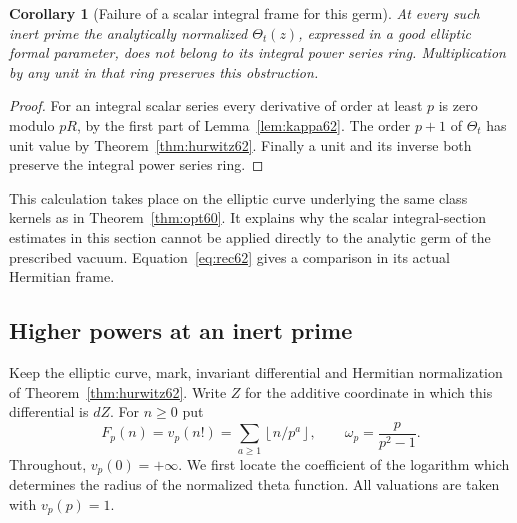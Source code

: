 \documentclass[a4paper,11pt]{article}
\newtheorem{corollary}[proposition]{Corollary}
\theoremstyle{definition}
\theoremstyle{remark}
\numberwithin{equation}{section}
\begin{document}
\begin{corollary}[Failure of a scalar integral frame for this germ]\label{cor:obstacle62}
At every such inert prime the analytically normalized
\(\Theta_t(z)\), expressed in a good elliptic formal parameter,
does not belong to its integral power series ring. Multiplication
by any unit in that ring preserves this obstruction.
\end{corollary}
\begin{proof}
For an integral scalar series every derivative of order at least
\(p\) is zero modulo \(pR\), by the first part of
Lemma~\ref{lem:kappa62}. The order \(p+1\) of \(\Theta_t\)
has unit value by Theorem~\ref{thm:hurwitz62}. Finally a unit
and its inverse both preserve the integral power series ring.
\end{proof}

This calculation takes place on the elliptic curve underlying the
same class kernels as in Theorem~\ref{thm:opt60}. It explains why
the scalar integral-section estimates in this section cannot be
applied directly to the analytic germ of the prescribed vacuum.
Equation~\eqref{eq:rec62} gives a comparison in its actual
Hermitian frame.

\subsection{Higher powers at an inert prime}\label{nav:V-24}
Keep the elliptic curve, mark, invariant differential and Hermitian
normalization of Theorem~\ref{thm:hurwitz62}. Write \(Z\) for the
additive coordinate in which this differential is \(dZ\).
For \(n\ge0\) put
\[
    F_p(n)=v_p(n!)=\sum_{a\ge1}\left\lfloor n/p^a\right\rfloor,
       \qquad \omega_p=\frac{p}{p^2-1}.
\]
Throughout, \(v_p(0)=+\infty\). We first locate the coefficient of
the logarithm which determines the radius of the normalized theta
function. All valuations are taken with \(v_p(p)=1\).
\end{document}
